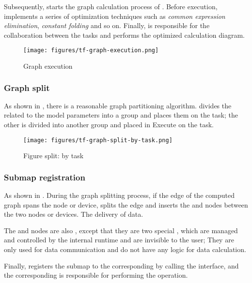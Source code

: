 \begin{content}
Subsequently,  starts the graph calculation process of . Before execution,  implements a series of optimization techniques such as \emph{common expression elimination}, \emph{constant folding} and so on. Finally,  is responsible for the collaboration between the tasks and performs the optimized calculation diagram.

\begin{figure}[!htbp]
  \centering
  \texttt{[image: figures/tf-graph-execution.png]}
  \caption{Graph execution}
  \label{fig:tf-graph-execution}
\end{figure}


\subsubsection{Graph split}
As shown in , there is a reasonable graph partitioning algorithm.  divides the  related to the model parameters into a group and places them on the  task; the other  is divided into another group and placed in  Execute on the task.

\begin{figure}[!htbp]
  \centering
  \texttt{[image: figures/tf-graph-split-by-task.png]}
  \caption{Figure split: by task}
  \label{fig:tf-graph-split-by-task}
\end{figure}


\subsubsection{Submap registration}

As shown in . During the graph splitting process, if the edge of the computed graph spans the node or device,  splits the edge and inserts the  and  nodes between the two nodes or devices. The delivery of data.

The  and  nodes are also , except that they are two special , which are managed and controlled by the internal runtime and are invisible to the user; They are only used for data communication and do not have any logic for data calculation.

Finally,  registers the submap to the corresponding  by calling the  interface, and the corresponding  is responsible for performing the operation.


\end{content}
